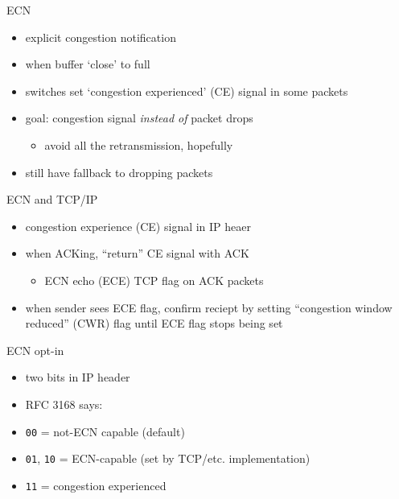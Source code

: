 \begin{frame}{ECN}
\begin{itemize}
\item explicit congestion notification
\vspace{.5cm}
\item when buffer `close' to full
\item switches set `congestion experienced' (CE) signal in some packets
\item goal: congestion signal \textit{instead of} packet drops
    \begin{itemize}
    \item avoid all the retransmission, hopefully
    \end{itemize}
\vspace{.5cm}
\item still have fallback to dropping packets
\end{itemize}
\end{frame}

\begin{frame}{ECN and TCP/IP}
\begin{itemize}
\item congestion experience (CE) signal in IP heaer
\item when ACKing, ``return'' CE signal with ACK
    \begin{itemize}
    \item ECN echo (ECE) TCP flag on ACK packets
    \end{itemize}
\vspace{.25cm}
\item when sender sees ECE flag, confirm reciept by setting
    ``congestion window reduced'' (CWR) flag until ECE flag stops being set
\end{itemize}
\end{frame}

\begin{frame}{ECN opt-in}
    \begin{itemize}
    \item two bits in IP header
    \item RFC 3168 says:
    \vspace{.5cm}
    \item \texttt{00} = not-ECN capable (default)
    \item \texttt{01}, \texttt{10} = ECN-capable (set by TCP/etc. implementation)
    \item \texttt{11} = congestion experienced
    \end{itemize}
\end{frame}

